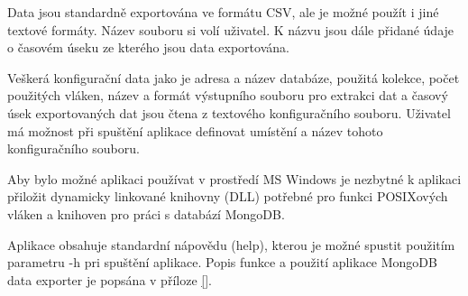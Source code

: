 Data jsou standardně exportována ve formátu CSV, ale je možné použít i jiné textové formáty. Název souboru si volí uživatel. K názvu jsou dále přidané údaje o časovém úseku ze kterého jsou data exportována.

Veškerá konfigurační data jako je adresa a název databáze, použitá kolekce, počet použitých vláken, název a formát výstupního souboru pro extrakci dat a časový úsek exportovaných dat jsou čtena z textového konfiguračního souboru. Uživatel má možnost při spuštění aplikace definovat umístění a název tohoto konfiguračního souboru. 

Aby bylo možné aplikaci používat v prostředí MS Windows je nezbytné k aplikaci přiložit dynamicky linkované knihovny (DLL) potřebné pro funkci POSIXových vláken a knihoven pro práci s databází MongoDB.   

Aplikace obsahuje standardní nápovědu (help), kterou je možné spustit použitím parametru -h pri spuštění aplikace. Popis funkce a použití aplikace MongoDB data exporter je popsána v příloze \ref{}.